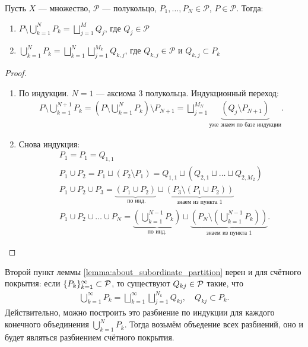 \begin{lm}
 \label{lemma:about_subordinate_partition}
 Пусть $ X $ --- множество, $ \mathcal{P} $ --- полукольцо, $ P_1, \ldots, P_N \in \mathcal{P} $, $ P \in \mathcal{P} $. Тогда:
 \begin{enumerate}
  \item $ \displaystyle P \setminus \bigcup_{k=1}^N P_k = \bigsqcup_{j=1}^M Q_j $, где $ Q_j \in \mathcal{P} $
  \item $ \displaystyle \bigcup_{k=1}^N P_k = \bigsqcup_{k=1}^N \bigsqcup_{j=1}^{M_k} Q_{k,j} $, где $ Q_{k,j} \in \mathcal{P} $ и $ Q_{k,j} \subset P_k $
 \end{enumerate} 
\end{lm}
\begin{proof}\
 \begin{enumerate}
  \item По индукции. $ N = 1$ --- аксиома 3 полукольца. Индукционный переход:
   \begin{align*}
    P \setminus \bigcup_{k=1}^{N+1} P_k = \left( P \setminus \bigcup_{k=1}^N P_k \right) \setminus P_{N+1} =  \bigsqcup_{j=1}^{M_N} \underbrace{\left( Q_j \setminus P_{N+1} \right)}_{\text{уже знаем по базе индукции}}
   .\end{align*}
  \item Снова индукция:
   \begin{align*}
    &P_1 = P_1 = Q_{1,1} \\
    &P_1 \cup P_2 = P_1 \sqcup (P_2 \setminus P_1) = Q_{1,1} \sqcup (Q_{2,1} \sqcup \ldots \sqcup Q_{2, M_2}) \\
    &P_1 \cup P_2 \cup P_3 = \underbrace{(P_1 \cup P_2)}_{\text{ по инд.}} \sqcup \underbrace{(P_3 \setminus (P_1 \cup P_2))}_{\text{ знаем из пункта 1 }} \\
    &P_1 \cup P_2 \cup \dots \cup P_N = \underbrace{\left(\bigcup_{k = 1}^{N - 1} P_k\right)}_{\text{ по инд. }} \sqcup \underbrace{\left(P_N \setminus \left(\bigcup_{k = 1}^{N - 1} P_k\right)\right)}_{\text{ знаем из пункта 1  } }
   .\end{align*}
 \end{enumerate}
\end{proof}
\begin{remrk}
 Второй пункт леммы \ref{lemma:about_subordinate_partition} верен и для счётного покрытия: если $\{P_{k}\}_{k=1}^{\infty} \subset \mathcal{P} $, то существуют $Q_{kj} \in \mathcal{P}$ такие, что
 \begin{align*}
  \bigcup_{k=1}^{\infty} P_k = \bigsqcup_{k=1}^{\infty} \bigsqcup_{j=1}^{N_k} Q_{kj}, \quad Q_{kj} \subset P_k
 .\end{align*} Действительно, можно построить это разбиение по индукции для каждого конечного объединения $\bigcup_{k=1}^{N} P_k $. Тогда возьмём объедение всех разбиений, оно и будет являться разбиением счётного покрытия. 
\end{remrk}

